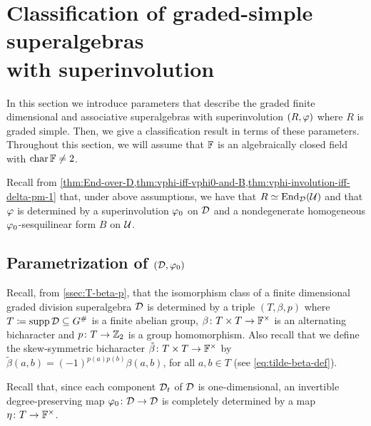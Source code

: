 
\section{Classification of graded-simple superalgebras\texorpdfstring{\\}{} with superinvolution}\label{sec:classification-grd-simple-with-sinv}

In this section we introduce parameters that describe the graded finite dimensional and associative superalgebras with superinvolution $(R, \varphi)$ where $R$ is graded simple.
Then, we give a classification result in terms of these parameters.
Throughout this section, we will assume that $\mathbb{F}$ is an algebraically closed field with $\operatorname{char} \mathbb{F} \neq 2$.

Recall from \cref{thm:End-over-D,thm:vphi-iff-vphi0-and-B,thm:vphi-involution-iff-delta-pm-1}
that, under above assumptions, we have that $R \simeq \operatorname{End}_{\mathcal{D}} (\mathcal U)$ and that $\varphi$ is determined by a superinvolution $\varphi_0$ on $\mathcal{D}$ and a nondegenerate homogeneous $\varphi_0$-sesquilinear form $B$ on $\mathcal U$.

\subsection{Parametrization of \texorpdfstring{$(\mathcal{D}, \varphi_0)$}{(D, phi0)}}\label{ssec:param-D-vphi}

Recall, from \cref{ssec:T-beta-p}, that the isomorphism class of a finite dimensional graded division superalgebra $\mathcal{D}$ is determined by a triple $(T, \beta, p)$ where $T \coloneqq \operatorname{supp} \mathcal{D} \subseteq G^\#$ is a finite abelian group, $\beta\colon T\times T \to \mathbb{F}^\times$ is an alternating bicharacter and $p\colon T \to \mathbb{Z}_2$ is a group homomorphism. 
Also recall that we define the skew-symmetric bicharacter $\tilde\beta \colon T\times T \to \mathbb{F}^\times$ by $\tilde\beta (a,b) = (-1)^{p(a) p(b)} \beta(a, b)$, for all $a, b \in T$ (see \cref{eq:tilde-beta-def}). 

Recall that, since each component $\mathcal{D}_t$ of $\mathcal{D}$ is one-dimensional, an invertible degree-preserving map $\varphi_0\colon \mathcal{D} \to \mathcal{D}$ is completely determined by a map $\eta\colon T \to \mathbb{F}^\times$.

